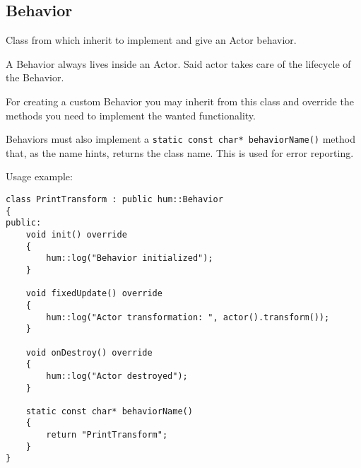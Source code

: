 \subsection{Behavior}

Class from which inherit to implement and give an Actor behavior.

A Behavior always lives inside an Actor. Said actor takes care of the lifecycle
of the Behavior.

For creating a custom Behavior you may inherit from this class and override
the methods you need to implement the wanted functionality.

Behaviors must also implement a \texttt{static const char* behaviorName()} method that,
as the name hints, returns the class name. This is used for error reporting.

Usage example:
\begin{lstlisting}[caption=Behavior example.]
class PrintTransform : public hum::Behavior
{
public:
    void init() override
    {
        hum::log("Behavior initialized");
    }

    void fixedUpdate() override
    {
        hum::log("Actor transformation: ", actor().transform());
    }

    void onDestroy() override
    {
        hum::log("Actor destroyed");
    }

    static const char* behaviorName()
    {
        return "PrintTransform";
    }
}
\end{lstlisting}

